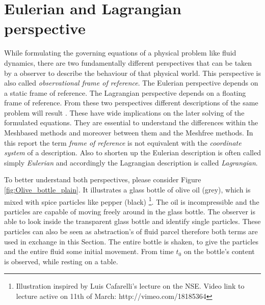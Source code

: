 

\section{Eulerian and Lagrangian perspective} 
\label{sec:mathperspective}

While formulating the governing equations of a physical problem like fluid dynamics, there are two fundamentally different perspectives that can be taken by a observer to describe
the behaviour of that physical world. This perspective is also called \emph{observational frame of reference}. The Eulerian perspective depends on a static frame of reference. The Lagrangian perspective depends on a floating frame of reference. From these two perspectives different descriptions of the same problem will result . These have wide implications on the later solving of the formulated equations. They are essential to understand the differences within the Meshbased methods and moreover between them and the Meshfree methods.    In this report the term \emph{frame of reference} is not equivalent with the \emph{coordinate system} of a description. Also to shorten up the Eulerian description is often called simply \emph{Eulerian} and accordingly the Lagrangian description is called \emph{Lagrangian}.

To better understand both perspectives, please consider Figure \ref{fig:Olive_bottle_plain}. It illustrates
a glass bottle of olive oil (grey), which is mixed with spice particles like pepper (black) \footnote{Illustration inspired by Luis Cafarelli's lecture on the NSE. Video link to lecture active on 11th of March: http://vimeo.com/18185364}. The oil is incompressible and the particles are capable of moving freely around in the glass bottle. The observer is able to look inside the transparent glass bottle and identify single particles. These particles can also be seen as abstraction's of fluid parcel therefore both terms are used in exchange in this Section. The entire bottle is shaken, to give the particles and the entire fluid some initial movement. From time $t_{0}$ on the bottle's content is observed, while resting on a table.


